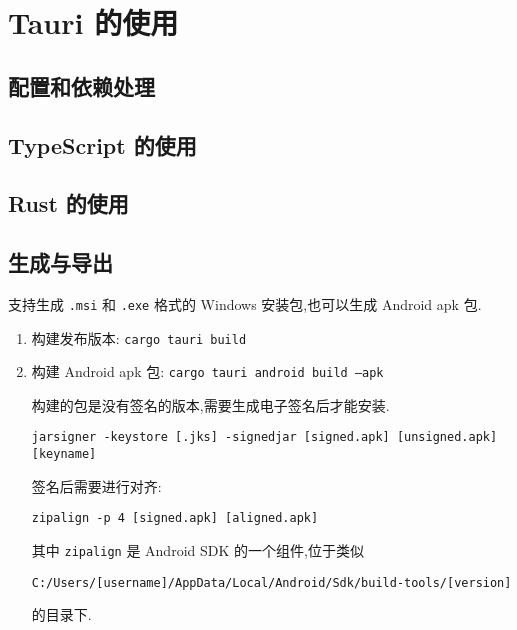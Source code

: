 
\usepackage{../../lectures_preamble}


    \section{Tauri 的使用}
    \subsection{配置和依赖处理}
    \subsection{TypeScript 的使用}
    \subsection{Rust 的使用}
    \subsection{生成与导出}
    支持生成 \texttt{.msi} 和 \texttt{.exe} 格式的 Windows 安装包,也可以生成 Android apk 包.

    \begin{enumerate}
        \item 构建发布版本: \texttt{cargo tauri build}
        \item 构建 Android apk 包: \texttt{cargo tauri android build --apk}

            构建的包是没有签名的版本,需要生成电子签名后才能安装.

            \texttt{jarsigner -keystore [.jks] -signedjar [signed.apk] [unsigned.apk] [keyname]}

            签名后需要进行对齐:

            \texttt{zipalign -p 4 [signed.apk] [aligned.apk]}

            其中 \texttt{zipalign} 是 Android SDK 的一个组件,位于类似
            
            \texttt{C:/Users/[username]/AppData/Local/Android/Sdk/build-tools/[version]}

            的目录下.
    \end{enumerate}

